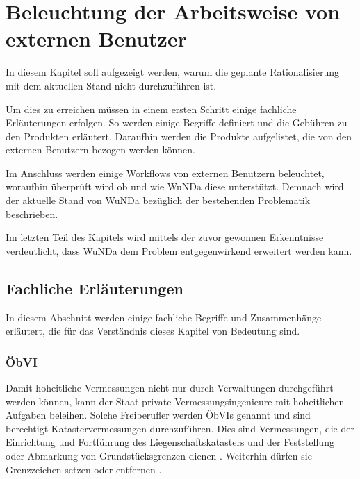 \chapter{Beleuchtung der Arbeitsweise von externen Benutzer}

In diesem Kapitel soll aufgezeigt werden, warum die geplante Rationalisierung mit dem aktuellen Stand nicht durchzuführen ist.

Um dies zu erreichen müssen in einem ersten Schritt einige fachliche Erläuterungen erfolgen. So werden einige Begriffe definiert und die Gebühren zu den Produkten erläutert. Daraufhin  werden die Produkte aufgelistet, die von den externen Benutzern bezogen werden können.

Im Anschluss werden einige Workflows von externen Benutzern beleuchtet, woraufhin überprüft wird ob und wie \ac{WuNDa} diese unterstützt. Demnach wird der aktuelle Stand von \ac{WuNDa} bezüglich der bestehenden Problematik beschrieben.

Im letzten Teil des Kapitels wird mittels der zuvor gewonnen Erkenntnisse verdeutlicht, dass \ac{WuNDa} dem Problem entgegenwirkend erweitert werden kann. 


\section{Fachliche Erläuterungen}
In diesem Abschnitt werden einige fachliche Begriffe und Zusammenhänge erläutert, die für das Verständnis dieses Kapitel von Bedeutung sind.

\subsection{ÖbVI}
Damit hoheitliche Vermessungen nicht nur durch Verwaltungen durchgeführt werden können, kann der Staat private Vermessungsingenieure mit hoheitlichen Aufgaben beleihen.
Solche Freiberufler werden \acfp{ÖbVI} genannt und sind berechtigt Katastervermessungen durchzuführen. Dies sind Vermessungen, die der Einrichtung und Fortführung des Liegenschaftskatasters und der Feststellung oder Abmarkung von Grundstücksgrenzen dienen \autocite[vgl.][]{bdvi-oebvi}.
Weiterhin dürfen sie Grenzzeichen setzen oder entfernen \autocite[vgl.][]{wolff-oebvi}.

